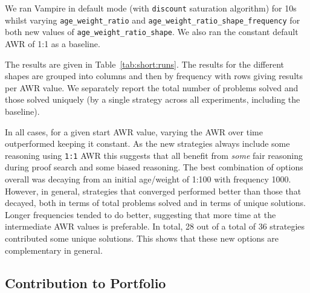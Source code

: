 \documentclass{llncs}
\begin{document}
We ran Vampire in default mode (with {\tt discount} saturation algorithm) for 10s whilst varying  \texttt{age\_weight\_ratio} and \texttt{age\_weight\_ratio\_shape\_frequency} for both new values of \texttt{age\_weight\_ratio\_shape}. We also ran the constant default AWR of 1:1 as a baseline. 

The results are given in Table~\ref{tab:short:runs}. The results for the different shapes are grouped into columns and then by frequency with rows giving results per AWR value.
We separately report the total number of problems solved and those solved uniquely (by a single strategy across all experiments, including the baseline).

In all cases, for a given start AWR value, varying the AWR over time outperformed keeping it constant. As the new strategies always include some reasoning using \verb|1:1| AWR this suggests that all benefit from \emph{some} fair reasoning during proof search and some biased reasoning. 
The best combination of options overall was decaying from an initial age/weight of 1:100 with frequency 1000.
However, in general, strategies that converged performed better than those that decayed, both in terms of total problems solved and in terms of unique solutions. 
Longer frequencies tended to do better, suggesting that more time at the intermediate AWR values is preferable. 
In total, 28 out of a total of 36 strategies contributed some unique solutions. This shows that these new options are complementary in general.

\subsection{Contribution to Portfolio}
\end{document}
